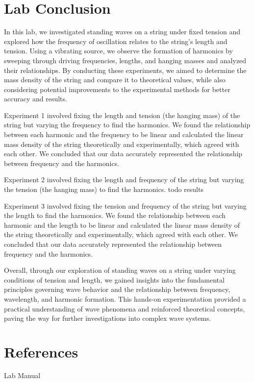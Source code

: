 \documentclass[11pt]{article}
\let\oldsection\section
\renewcommand\section{\clearpage\oldsection}
\begin{document}
    \section{Lab Conclusion}\label{sec:lab_conclusion}
    In this lab, we investigated standing waves on a string under fixed tension and explored how the frequency of oscillation relates to the string's length and tension. Using a vibrating source, we observe the formation of harmonics by sweeping through driving frequencies, lengths, and hanging masses and analyzed their relationships. By conducting these experiments, we aimed to determine the mass density of the string and compare it to theoretical values, while also considering potential improvements to the experimental methods for better accuracy and results.
    
    Experiment 1 involved fixing the length and tension (the hanging mass) of the string but varying the frequency to find the harmonics. We found the relationship between each harmonic and the frequency to be linear and calculated the linear mass density of the string theoretically and experimentally, which agreed with each other. We concluded that our data accurately represented the relationship between frequency and the harmonics.

    Experiment 2 involved fixing the length and frequency of the string but varying the tension (the hanging mass) to find the harmonics. todo results

    Experiment 3 involved fixing the tension and frequency of the string but varying the length to find the harmonics. We found the relationship between each harmonic and the length to be linear and calculated the linear mass density of the string theoretically and experimentally, which agreed with each other. We concluded that our data accurately represented the relationship between frequency and the harmonics.

    Overall, through our exploration of standing waves on a string under varying conditions of tension and length, we gained insights into the fundamental principles governing wave behavior and the relationship between frequency, wavelength, and harmonic formation. This hands-on experimentation provided a practical understanding of wave phenomena and reinforced theoretical concepts, paving the way for further investigations into complex wave systems.
    
    \appendix
    \section{References}\label{sec:references}

    Lab Manual
\end{document}
